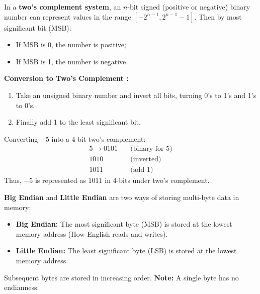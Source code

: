 \begin{Def}
    
    In a \textbf{two's complement system}, an $n$-bit signed (positive or negative) binary number can represent values in the range $[-2^{n-1}, 2^{n-1}-1]$. Then by most significant bit (MSB):
    \begin{itemize}
        \item If MSB is 0, the number is positive;
        \item If MSB is 1, the number is negative.
    \end{itemize}
    \noindent
    \textbf{Conversion to Two's Complement :}
    \begin{enumerate}
        \item Take an unsigned binary number and invert all bits, turning 0's to 1's and 1's to 0's.
        \item Finally add 1 to the least significant bit.
    \end{enumerate}
\end{Def}

\begin{Example}
    
    \noindent
    Converting $-5$ into a 4-bit two's complement:
    \begin{align*}
        5 \rightarrow 0101 \quad & \text{(binary for 5)} \\
         1010 \quad & \text{(inverted)} \\
         1011 \quad & \text{(add 1)}
    \end{align*}
    Thus, $-5$ is represented as $1011$ in 4-bits under two's complement.
\end{Example}

\begin{Def}
    
    \textbf{Big Endian} and \textbf{Little Endian} are two ways of storing multi-byte data in memory:
    \begin{itemize}
        \item \textbf{Big Endian:} The most significant byte (MSB) is stored at the lowest memory address 
        (How English reads and writes).
        \item \textbf{Little Endian:} The least significant byte (LSB) is stored at the lowest memory address.
    \end{itemize}

    \noindent
    Subsequent bytes are stored in increasing order. \textbf{Note:} A single byte has no endianness.
\end{Def}


